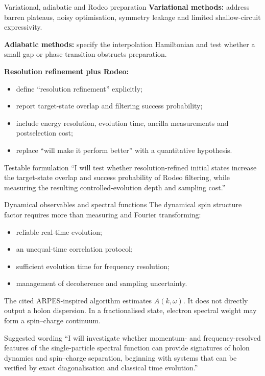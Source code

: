 \documentclass[aspectratio=169,11pt]{beamer}
\begin{document}
\begin{frame}{Variational, adiabatic and Rodeo preparation}
\textbf{Variational methods:} address barren plateaus, noisy optimisation, symmetry leakage and limited shallow-circuit expressivity.

\medskip
\textbf{Adiabatic methods:} specify the interpolation Hamiltonian and test whether a small gap or phase transition obstructs preparation.

\medskip
\textbf{Resolution refinement plus Rodeo:}
\begin{itemize}
  \item define ``resolution refinement'' explicitly;
  \item report target-state overlap and filtering success probability;
  \item include energy resolution, evolution time, ancilla measurements and postselection cost;
  \item replace ``will make it perform better'' with a quantitative hypothesis.
\end{itemize}

\begin{block}{Testable formulation}
``I will test whether resolution-refined initial states increase the target-state overlap and success probability of Rodeo filtering, while measuring the resulting controlled-evolution depth and sampling cost.''
\end{block}
\end{frame}

\begin{frame}{Dynamical observables and spectral functions}
The dynamical spin structure factor requires more than measuring and Fourier transforming:
\begin{itemize}
  \item reliable real-time evolution;
  \item an unequal-time correlation protocol;
  \item sufficient evolution time for frequency resolution;
  \item management of decoherence and sampling uncertainty.
\end{itemize}

The cited ARPES-inspired algorithm estimates $A(k,\omega)$. It does not directly output a holon dispersion. In a fractionalised state, electron spectral weight may form a spin--charge continuum.

\begin{block}{Suggested wording}
``I will investigate whether momentum- and frequency-resolved features of the single-particle spectral function can provide signatures of holon dynamics and spin--charge separation, beginning with systems that can be verified by exact diagonalisation and classical time evolution.''
\end{block}
\end{frame}
\end{document}
